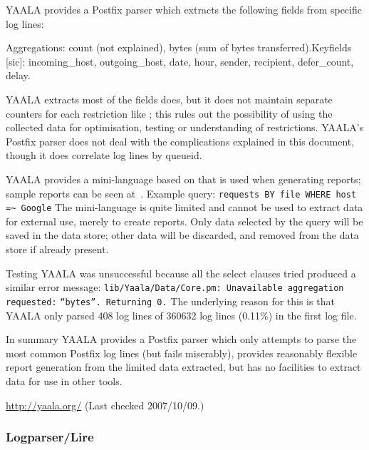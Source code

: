 YAALA provides a Postfix parser which extracts the following fields from
specific log lines:

\noindent\tab{}Aggregations: count (not explained), bytes (sum of bytes
transferred).\newline \tab{}Keyfields [sic]: incoming\_host,
outgoing\_host, date, hour, sender, recipient, defer\_count, delay.

YAALA extracts most of the fields \parsername{} does, but it does not
maintain separate counters for each restriction like \parsername{}; this
rules out the possibility of using the collected data for  optimisation,
testing or understanding of restrictions.  YAALA's Postfix parser does not
deal with the complications explained in this document, though it does
correlate log lines by queueid.

YAALA provides a mini-language based on \SQL{} that is used when generating
reports; sample reports can be seen at~\cite{yaala-samples}.  Example
query: \newline \tab{} \texttt{requests BY file WHERE host =\~{} Google}
\newline The mini-language is quite limited and cannot be used to extract
data for external use, merely to create reports.  Only data selected by the
query will be saved in the data store; other data will be discarded, and
removed from the data store if already present.

Testing YAALA was unsuccessful because all the select clauses tried
produced a similar error message:
\newline\tab{}\texttt{lib/Yaala/Data/Core.pm: Unavailable aggregation
requested:} \newline\tab{}\texttt{``bytes''. Returning 0.} \newline  The
underlying reason for this is that YAALA only parsed 408 log lines of
360632 log lines (0.11\%) in the first log file.

In summary YAALA provides a Postfix parser which only attempts to parse the
most common Postfix log lines (but fails miserably), provides reasonably
flexible report generation from the limited data extracted, but has no
facilities to extract data for use in other tools.

\url{http://yaala.org/} \newline (Last checked 2007/10/09.)

\subsubsection{Logparser/Lire}

